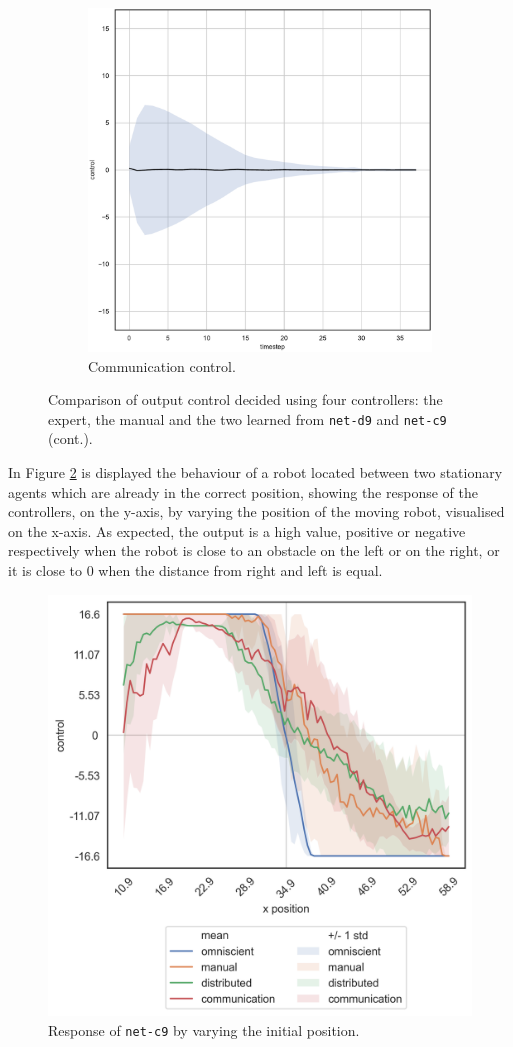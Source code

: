 \begin{figure}[!htb]
\begin{center}
\begin{subfigure}[h]{0.35\textwidth}
			\includegraphics[width=\textwidth]{contents/images/net-c9/control-overtime-learned_communication}
			\caption{Communication control.}
		\end{subfigure}
	\end{center}
	\caption[]{Comparison of output control decided using four controllers: the 
		expert, the manual and the two learned from \texttt{net-d9} and 
		\texttt{net-c9} (cont.).}
	\label{fig:net-c9control}
\end{figure}

In Figure \ref{fig:net-c9responseposition} is displayed the behaviour of a robot 
located between two stationary agents which are already in the correct position, 
showing the response of the controllers, on the y-axis, by varying the position of 
the moving robot, visualised on the x-axis. As expected, the output is a high 
value, positive or negative respectively when the robot is close to an obstacle on 
the left or on the right, or it is close to $0$ when the distance from right and left 
is equal.
\begin{figure}[!htb]
	\centering
	\includegraphics[width=.45\textwidth]{contents/images/net-c9/response-varying_init_position-communication}%
	\caption{Response of \texttt{net-c9} by varying the initial position.}
	\label{fig:net-c9responseposition}
\end{figure}

